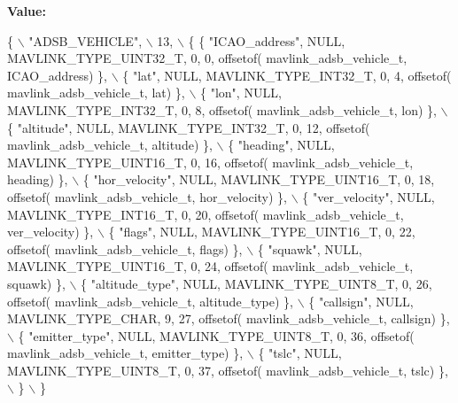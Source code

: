 {\bfseries Value\+:}
\begin{DoxyCode}
\{ \(\backslash\)
    \textcolor{stringliteral}{"ADSB\_VEHICLE"}, \(\backslash\)
    13, \(\backslash\)
    \{  \{ \textcolor{stringliteral}{"ICAO\_address"}, NULL, MAVLINK_TYPE_UINT32_T, 0, 0, offsetof(
      mavlink_adsb_vehicle_t, ICAO\_address) \}, \(\backslash\)
         \{ \textcolor{stringliteral}{"lat"}, NULL, MAVLINK_TYPE_INT32_T, 0, 4, offsetof(
      mavlink_adsb_vehicle_t, lat) \}, \(\backslash\)
         \{ \textcolor{stringliteral}{"lon"}, NULL, MAVLINK_TYPE_INT32_T, 0, 8, offsetof(
      mavlink_adsb_vehicle_t, lon) \}, \(\backslash\)
         \{ \textcolor{stringliteral}{"altitude"}, NULL, MAVLINK_TYPE_INT32_T, 0, 12, offsetof(
      mavlink_adsb_vehicle_t, altitude) \}, \(\backslash\)
         \{ \textcolor{stringliteral}{"heading"}, NULL, MAVLINK_TYPE_UINT16_T, 0, 16, offsetof(
      mavlink_adsb_vehicle_t, heading) \}, \(\backslash\)
         \{ \textcolor{stringliteral}{"hor\_velocity"}, NULL, MAVLINK_TYPE_UINT16_T, 0, 18, offsetof(
      mavlink_adsb_vehicle_t, hor\_velocity) \}, \(\backslash\)
         \{ \textcolor{stringliteral}{"ver\_velocity"}, NULL, MAVLINK_TYPE_INT16_T, 0, 20, offsetof(
      mavlink_adsb_vehicle_t, ver\_velocity) \}, \(\backslash\)
         \{ \textcolor{stringliteral}{"flags"}, NULL, MAVLINK_TYPE_UINT16_T, 0, 22, offsetof(
      mavlink_adsb_vehicle_t, flags) \}, \(\backslash\)
         \{ \textcolor{stringliteral}{"squawk"}, NULL, MAVLINK_TYPE_UINT16_T, 0, 24, offsetof(
      mavlink_adsb_vehicle_t, squawk) \}, \(\backslash\)
         \{ \textcolor{stringliteral}{"altitude\_type"}, NULL, MAVLINK_TYPE_UINT8_T, 0, 26, offsetof(
      mavlink_adsb_vehicle_t, altitude\_type) \}, \(\backslash\)
         \{ \textcolor{stringliteral}{"callsign"}, NULL, MAVLINK_TYPE_CHAR, 9, 27, offsetof(
      mavlink_adsb_vehicle_t, callsign) \}, \(\backslash\)
         \{ \textcolor{stringliteral}{"emitter\_type"}, NULL, MAVLINK_TYPE_UINT8_T, 0, 36, offsetof(
      mavlink_adsb_vehicle_t, emitter\_type) \}, \(\backslash\)
         \{ \textcolor{stringliteral}{"tslc"}, NULL, MAVLINK_TYPE_UINT8_T, 0, 37, offsetof(
      mavlink_adsb_vehicle_t, tslc) \}, \(\backslash\)
         \} \(\backslash\)
\}
\end{DoxyCode}
\mbox{\label{mavlink__msg__adsb__vehicle_8h_a87fcb2e860b338240c909ecc2d5a9966}} 
